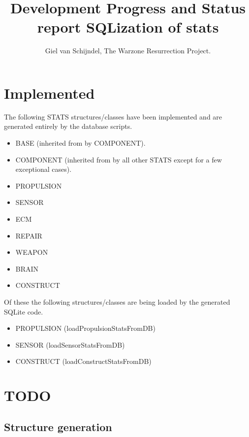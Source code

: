 \documentclass{article}
\title{Development Progress and Status report SQLization of stats}
\author{Giel van Schijndel, The Warzone Resurrection Project.}
\begin{document}
\maketitle
\tableofcontents
\newpage

\section{Implemented}

The following STATS structures/classes have been implemented and are generated
entirely by the database scripts.
\begin{itemize}
  \item BASE (inherited from by COMPONENT).
  \item COMPONENT (inherited from by all other STATS except for a few
    exceptional cases). 
  \item PROPULSION
  \item SENSOR
  \item ECM
  \item REPAIR
  \item WEAPON
  \item BRAIN 
  \item CONSTRUCT 
\end{itemize}

Of these the following structures/classes are being loaded by the generated
SQLite code.
\begin{itemize}
  \item PROPULSION (loadPropulsionStatsFromDB)
  \item SENSOR (loadSensorStatsFromDB)
  \item CONSTRUCT (loadConstructStatsFromDB) 
\end{itemize}

\section{TODO}

\subsection{Structure generation}
\end{document}
